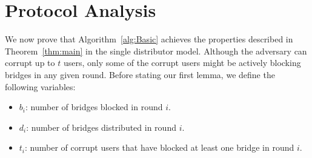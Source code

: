 \documentclass[letterpaper,twocolumn,10pt]{article}
\newcommand{\algFont}{\fontsize{10}{13}\selectfont}
\newcommand{\sfsize}{\fontsize{0.73\baselineskip}{0.73\baselineskip}\selectfont}
\newcommand{\sans}[1]{\textsf{\sfsize \mbox{#1}}}
\newcommand{\brix}{\sans{TorBrix}\xspace}
\begin{document}
%	

\section{Protocol Analysis} \label{sec:ProofBasic}
We now prove that Algorithm~\ref{alg:Basic} achieves the properties described in Theorem~\ref{thm:main} in the single distributor model. 
Although the adversary can corrupt up to $t$ users, only some of the corrupt users might be actively blocking bridges in any given round. %
Before stating our first lemma, we define the following variables:
\begin{itemize}
	\item $b_i$: number of bridges blocked in round $i$.	
	\item $d_i$: number of bridges distributed in round $i$.
	\item $t_i$: number of corrupt users that have blocked at least one bridge in round $i$.
\end{itemize}
\end{document}
